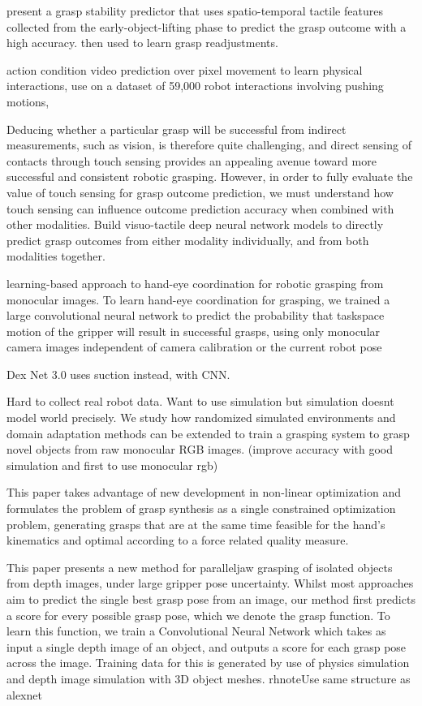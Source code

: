 present a grasp stability predictor that uses spatio-temporal tactile features collected from the early-object-lifting phase to predict the grasp outcome with a high accuracy. then used to learn grasp readjustments. \cite{chebotar2016self}

action condition video prediction over pixel movement to learn physical interactions, use on a dataset of 59,000 robot interactions involving pushing motions,\cite{finn2016unsupervised}

Deducing whether a particular grasp will be successful from indirect measurements, such as vision, is therefore quite challenging, and direct sensing of contacts through touch sensing provides an appealing avenue toward more successful and consistent robotic grasping. However, in order to fully evaluate the value of touch sensing for grasp outcome prediction, we must understand how touch sensing can influence outcome prediction accuracy when combined with other modalities. Build  visuo-tactile deep neural network models to directly predict grasp outcomes from either modality individually, and from both modalities together. \cite{calandra2017feeling}

learning-based approach to hand-eye coordination for robotic grasping from monocular images. To learn hand-eye coordination for grasping, we trained a large convolutional neural network to predict the probability that taskspace motion of the gripper will result in successful grasps, using only monocular camera images independent of camera calibration or the current robot pose~\cite{levine2016learning}

Dex Net 3.0 uses suction instead, with CNN\cite{mahler2017suction}. 

Hard to collect real robot data. Want to use simulation but simulation doesnt model world precisely. We study how randomized simulated environments and domain adaptation methods can be extended to train a grasping system to grasp novel objects from raw monocular RGB images. (improve accuracy with good simulation and first to use monocular rgb)~\cite{bousmalis2017using}


This paper takes advantage of new development in non-linear optimization and formulates the problem of grasp synthesis as a single constrained optimization problem, generating grasps that are at the same time feasible for the hand’s kinematics and optimal according to a force related quality measure.~\cite{el2012bridging}

This paper presents a new method for paralleljaw grasping of isolated objects from depth images, under large gripper pose uncertainty. Whilst most approaches aim to predict the single best grasp pose from an image, our method first predicts a score for every possible grasp pose, which we denote the grasp function. To learn this function, we train a Convolutional Neural Network which takes as input a single depth image of an object, and outputs a score for each grasp pose across the image. Training data for this is generated by use of physics simulation and depth image simulation with 3D object meshes. rhnote{Use same structure as alexnet}~\cite{johns2016deep}

